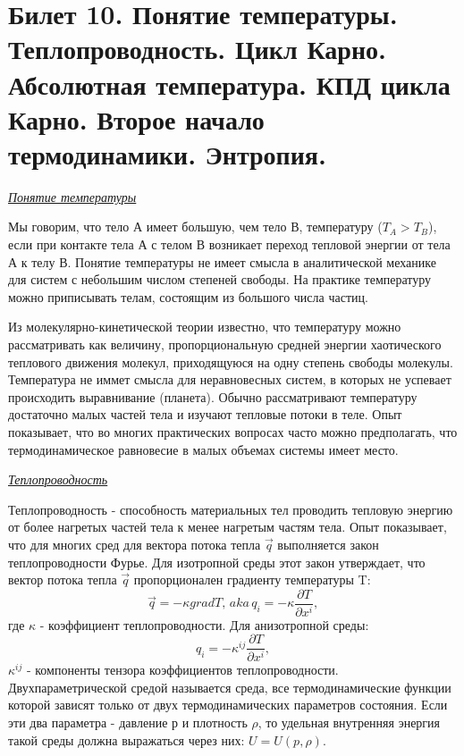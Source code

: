 \newpage
\section{Билет 10. Понятие температуры. Теплопроводность. Цикл Карно. Абсолютная температура. КПД цикла Карно. Второе начало термодинамики. Энтропия.}



\begin{center}
	\textit{\underline{Понятие температуры}}
\end{center}

Мы говорим, что тело А имеет большую, чем тело В, температуру ($T_A > T_B$), если при контакте тела А с телом В возникает переход тепловой энергии от тела А к телу В. Понятие температуры не имеет смысла в аналитической механике для систем с небольшим числом степеней свободы. На практике температуру можно приписывать телам, состоящим из большого числа частиц. 

Из молекулярно-кинетической теории известно, что температуру можно рассматривать как величину, пропорциональную средней энергии хаотического теплового движения молекул, приходящуюся на одну степень свободы молекулы.  Температура не иммет смысла для неравновесных систем, в которых не успевает происходить выравнивание (планета).  Обычно рассматривают температуру достаточно малых частей тела и изучают тепловые потоки в теле. Опыт показывает, что во многих практических вопросах часто можно предполагать, что термодинамическое равновесие в малых объемах системы имеет место.  


\begin{center}
	\textit{\underline{Теплопроводность}}
\end{center}

Теплопроводность - способность материальных тел проводить тепловую энергию от более нагретых частей тела к менее нагретым частям тела. Опыт показывает, что для многих сред для вектора потока тепла $\vec{q}$ выполняется закон теплопроводности Фурье. Для изотропной среды этот закон утверждает, что вектор потока тепла $\vec{q}$ пропорционален градиенту температуры T: $$\vec{q} = -\kappa grad T, \, aka \, q_i = -\kappa \frac{\partial T}{\partial x^i},$$ где $\kappa$ - коэффициент теплопроводности. Для анизотропной среды: $$q_i = -\kappa^{ij} \frac{\partial T}{\partial x^i},$$ $\kappa^{ij}$ - компоненты тензора коэффициентов теплопроводности.
Двухпараметрической средой называется среда, все термодинамические функции которой зависят только от двух термодинамических параметров состояния. Если эти два параметра - давление р и плотность $\rho$, то удельная внутренняя энергия такой среды должна выражаться через них: $U = U (p, \rho)$.

